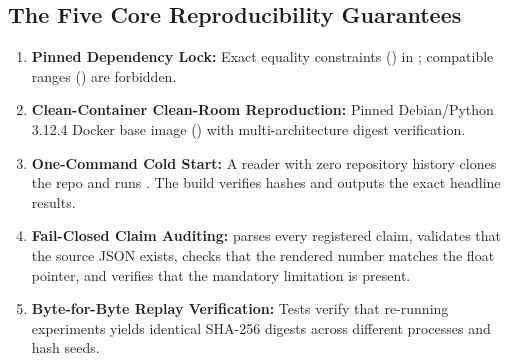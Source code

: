 \subsection{The Five Core Reproducibility Guarantees}
\begin{enumerate}
    \item \textbf{Pinned Dependency Lock:} Exact equality constraints (\code{==}) in ; compatible ranges (\code{>=}) are forbidden.
    \item \textbf{Clean-Container Clean-Room Reproduction:} Pinned Debian/Python 3.12.4 Docker base image () with multi-architecture digest verification.
    \item \textbf{One-Command Cold Start:} A reader with zero repository history clones the repo and runs . The build verifies hashes and outputs the exact headline results.
    \item \textbf{Fail-Closed Claim Auditing:}  parses every registered claim, validates that the source JSON exists, checks that the rendered number matches the float pointer, and verifies that the mandatory limitation is present.
    \item \textbf{Byte-for-Byte Replay Verification:} Tests verify that re-running experiments yields identical SHA-256 digests across different processes and hash seeds.
\end{enumerate}
